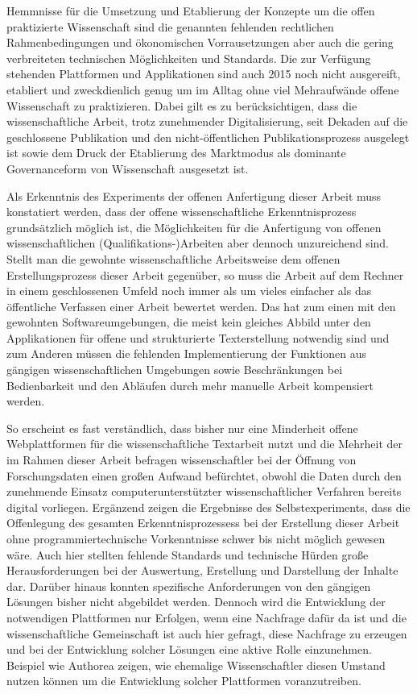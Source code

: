Hemmnisse für die Umsetzung und Etablierung der Konzepte um die offen praktizierte Wissenschaft sind die genannten fehlenden rechtlichen Rahmenbedingungen und ökonomischen Vorrausetzungen aber auch die gering verbreiteten technischen Möglichkeiten und Standards. Die zur Verfügung stehenden Plattformen und Applikationen sind auch 2015 noch nicht ausgereift, etabliert und zweckdienlich genug um im Alltag ohne viel Mehraufwände offene Wissenschaft zu praktizieren. Dabei gilt es zu berücksichtigen, dass die wissenschaftliche Arbeit, trotz zunehmender Digitalisierung, seit Dekaden auf die geschlossene Publikation und den nicht-öffentlichen Publikationsprozess ausgelegt ist sowie dem Druck der Etablierung des Marktmodus als dominante Governanceform von Wissenschaft ausgesetzt ist.

Als Erkenntnis des Experiments der offenen Anfertigung dieser Arbeit muss konstatiert werden, dass der offene wissenschaftliche Erkenntnisprozess grundsätzlich möglich ist, die Möglichkeiten für die Anfertigung von offenen wissenschaftlichen (Qualifikations-)Arbeiten aber dennoch unzureichend sind. Stellt man die gewohnte wissenschaftliche Arbeitsweise dem offenen Erstellungsprozess dieser Arbeit gegenüber, so muss die Arbeit auf dem Rechner in einem geschlossenen Umfeld noch immer als um vieles einfacher als das öffentliche Verfassen einer Arbeit bewertet werden. Das hat zum einen mit den gewohnten Softwareumgebungen, die meist kein gleiches Abbild unter den Applikationen für offene und  strukturierte Texterstellung notwendig sind und zum Anderen müssen die fehlenden Implementierung der Funktionen aus gängigen wissenschaftlichen Umgebungen sowie Beschränkungen bei Bedienbarkeit und den Abläufen durch mehr manuelle Arbeit kompensiert werden.

So erscheint es fast verständlich, dass bisher nur eine Minderheit offene Webplattformen für die wissenschaftliche Textarbeit \cite{Perkel_2014} nutzt und die Mehrheit der im Rahmen dieser Arbeit befragen wissenschaftler bei der Öffnung von Forschungsdaten einen großen Aufwand befürchtet, obwohl die Daten durch den zunehmende Einsatz computerunterstützter wissenschaftlicher Verfahren bereits digital vorliegen. Ergänzend zeigen die Ergebnisse des Selbstexperiments, dass die Offenlegung des gesamten Erkenntnisprozessess bei der Erstellung dieser Arbeit ohne programmiertechnische Vorkenntnisse schwer bis nicht möglich gewesen wäre. Auch hier stellten fehlende Standards und technische Hürden große Herausforderungen bei der Auswertung, Erstellung und Darstellung der Inhalte dar. Darüber hinaus konnten spezifische Anforderungen von den gängigen Lösungen bisher nicht abgebildet werden. Dennoch wird die Entwicklung der notwendigen Plattformen nur Erfolgen, wenn eine Nachfrage dafür da ist und die wissenschaftliche Gemeinschaft ist auch hier gefragt, diese Nachfrage zu erzeugen und bei der Entwicklung solcher Lösungen eine aktive Rolle einzunehmen. Beispiel wie Authorea zeigen, wie ehemalige Wissenschaftler diesen Umstand nutzen können um die Entwicklung solcher Plattformen voranzutreiben.

